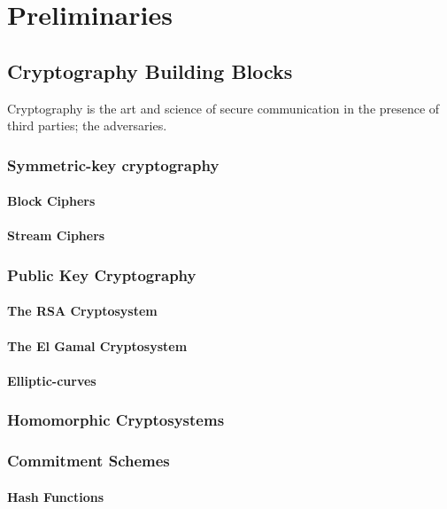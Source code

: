 \chapter{Preliminaries}
\label{preliminaries}

\section{Cryptography Building Blocks}
\label{preliminaries:crypto_block}

Cryptography is the art and science of secure communication in the presence of third parties; the adversaries.

\subsection{Symmetric-key cryptography}
\label{preliminaries:crypto_block:sym}

\subsubsection{Block Ciphers}
\label{preliminaries:crypto_block:sym:block}

\subsubsection{Stream Ciphers}
\label{preliminaries:crypto_block:sym:stream}

\subsection{Public Key Cryptography}
\label{preliminaries:crypto_block:pub}

\subsubsection{The RSA Cryptosystem}
\label{preliminaries:crypto_block:pub:rsa}

\subsubsection{The El Gamal Cryptosystem}
\label{preliminaries:crypto_block:pub:el_gamal}

\subsubsection{Elliptic-curves}
\label{preliminaries:crypto_block:pub:el_curves}

\subsection{Homomorphic Cryptosystems}
\label{preliminaries:crypto_block:homo}

\subsection{Commitment Schemes}
\label{preliminaries:crypto_block:comm}

\subsubsection{Hash Functions}
\label{preliminaries:crypto_block:pub:comm:hash}
